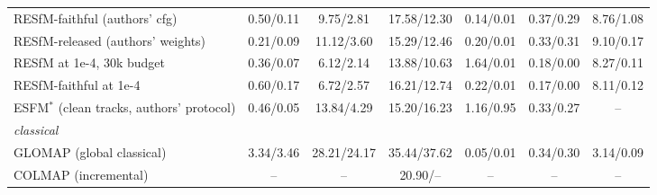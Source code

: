 \documentclass[10pt,letterpaper]{article}
\begin{document}
\begin{table}[t]
{\begin{tabular}{lcccccc}
RESfM-faithful (authors' cfg) & 0.50/0.11 & 9.75/2.81 & 17.58/12.30 & 0.14/0.01 & 0.37/0.29 & 8.76/1.08\\
RESfM-released (authors' weights) & 0.21/0.09 & 11.12/3.60 & 15.29/12.46 & 0.20/0.01 & 0.33/0.31 & 9.10/0.17\\
RESfM at 1e-4, 30k budget & 0.36/0.07 & 6.12/2.14 & 13.88/10.63 & 1.64/0.01 & 0.18/0.00 & 8.27/0.11\\
RESfM-faithful at 1e-4 & 0.60/0.17 & 6.72/2.57 & 16.21/12.74 & 0.22/0.01 & 0.17/0.00 & 8.11/0.12\\
ESFM$^{\ast}$ (clean tracks, authors' protocol) & 0.46/0.05 & 13.84/4.29 & 15.20/16.23 & 1.16/0.95 & 0.33/0.27 & --\\
\midrule
\multicolumn{7}{l}{\emph{classical}}\\[1pt]
GLOMAP (global classical) & 3.34/3.46 & 28.21/24.17 & 35.44/37.62 & 0.05/0.01 & 0.34/0.30 & 3.14/0.09\\
COLMAP (incremental) & -- & -- & 20.90/-- & -- & -- & --\\
\bottomrule
\end{tabular}}%
\end{table}
\end{document}
